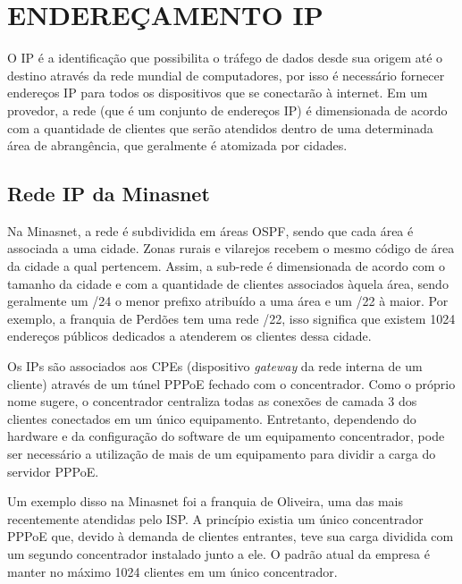 \chapter{ENDEREÇAMENTO IP}

    O IP é a identificação que possibilita o tráfego de dados desde sua origem até o destino através da rede mundial de computadores, por isso é necessário fornecer endereços IP para todos os dispositivos que se conectarão à internet. Em um provedor, a rede (que é um conjunto de endereços IP) é dimensionada de acordo com a quantidade de clientes que serão atendidos dentro de uma determinada área de abrangência, que geralmente é atomizada por cidades.

\section{Rede IP da Minasnet}
    
    Na Minasnet, a rede é subdividida em áreas OSPF, sendo que cada área é associada a uma cidade. Zonas rurais e vilarejos recebem o mesmo código de área da cidade a qual pertencem. Assim, a sub-rede é dimensionada de acordo com o tamanho da cidade e com a quantidade de clientes associados àquela área, sendo geralmente um /24 o menor prefixo atribuído a uma área e um /22 à maior. Por exemplo, a franquia de Perdões tem uma rede /22, isso significa que existem 1024 endereços públicos dedicados a atenderem os clientes dessa cidade.
    
   Os IPs são associados aos CPEs (dispositivo \textit{gateway} da rede interna de um cliente) através de um túnel PPPoE fechado com o concentrador. Como o próprio nome sugere, o concentrador centraliza todas as conexões de camada 3 dos clientes conectados em um único equipamento. Entretanto, dependendo do hardware e da configuração do software de um equipamento concentrador, pode ser necessário a utilização de mais de um equipamento para dividir a carga do servidor PPPoE. 
   
   Um exemplo disso na Minasnet foi a franquia de Oliveira, uma das mais recentemente atendidas pelo ISP. A princípio existia um único concentrador PPPoE que, devido à demanda de clientes entrantes, teve sua carga dividida com um segundo concentrador instalado junto a ele. O padrão atual da empresa é manter no máximo 1024 clientes em um único concentrador.
   

